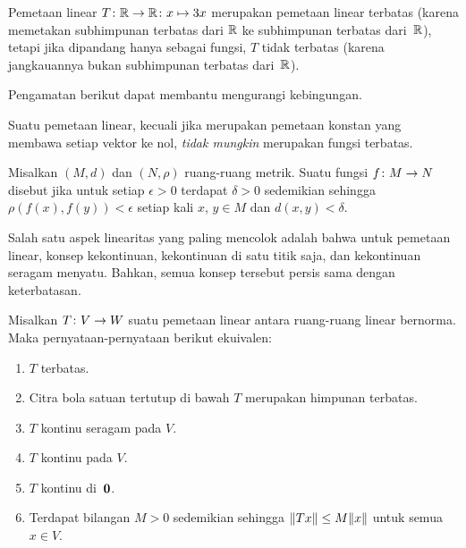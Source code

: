 \begin{exam} Pemetaan linear $T\colon \mathbb{R} \rightarrow \mathbb{R}\colon x \mapsto 3x$ merupakan pemetaan
linear terbatas (karena memetakan subhimpunan terbatas dari $\mathbb{R}$ ke subhimpunan terbatas
dari~$\mathbb{R}$), tetapi jika dipandang hanya sebagai fungsi, $T$ tidak terbatas (karena
jangkauannya bukan subhimpunan terbatas dari~$\mathbb{R}$).
\end{exam}

Pengamatan berikut dapat membantu mengurangi kebingungan.

\begin{prop} Suatu pemetaan linear, kecuali jika merupakan pemetaan konstan yang membawa
setiap vektor ke nol, \emph{tidak mungkin} merupakan fungsi terbatas.
\end{prop}

\begin{defn} Misalkan $(M,d)$ dan $(N,\rho)$ ruang-ruang metrik. Suatu fungsi
$f \colon M \rightarrow N$ disebut
 jika untuk setiap $\epsilon > 0$ terdapat $\delta > 0$ sedemikian
sehingga $\rho(f(x),f(y)) < \epsilon$ setiap kali $x$, $y \in M$ dan
$d(x,y) < \delta$.
\end{defn}

Salah satu aspek linearitas yang paling mencolok adalah bahwa untuk pemetaan linear,
konsep kekontinuan, kekontinuan di satu titik saja, dan kekontinuan seragam menyatu.
Bahkan, semua konsep tersebut persis sama dengan keterbatasan.

\begin{thm}\label{C023221} Misalkan $T \colon V \rightarrow W$ suatu pemetaan linear antara
ruang-ruang linear bernorma. Maka pernyataan-pernyataan berikut ekuivalen:
  \begin{enumerate}[label=\rm{(\alph*)}]
    \item $T$ terbatas.
    \item Citra bola satuan tertutup di bawah $T$ merupakan himpunan terbatas.
    \item $T$ kontinu seragam pada $V$.
    \item $T$ kontinu pada $V$.
    \item $T$ kontinu di~$\mathbf{0}$.
    \item Terdapat bilangan $M > 0$ sedemikian sehingga
$\lVert Tx\rVert \le M\lVert x\rVert$ untuk semua $x \in V$.
  \end{enumerate}
\end{thm}


